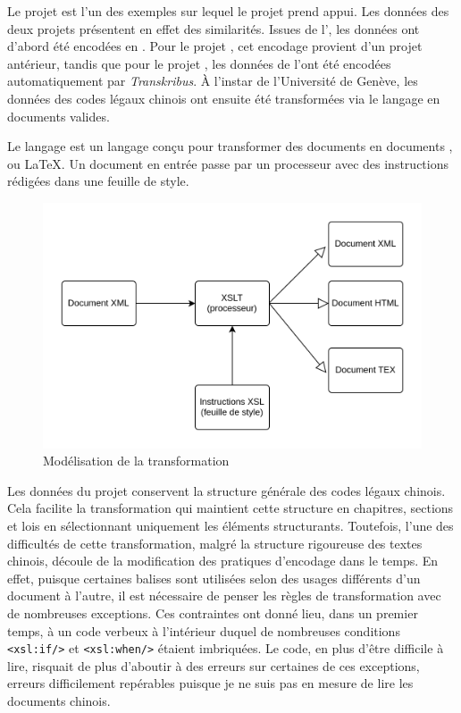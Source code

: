 Le projet \cordel est l'un des exemples sur lequel le projet \COREL prend appui. Les données des deux projets présentent en effet des similarités. Issues de l'\OCR, les données ont d'abord été encodées en \XML. Pour le projet \COREL, cet encodage provient d'un projet antérieur, tandis que pour le projet \cordel, les données de l'\OCR ont été encodées automatiquement par \textit{Transkribus}. À l'instar de l'Université de Genève, les données des codes légaux chinois ont ensuite été transformées via le langage \XSLT en documents \TEI valides. 

Le langage \XSLT est un langage \XML conçu pour transformer des documents \XML en documents \XML, \HTML ou \LaTeX. Un document \XML en entrée passe par un processeur \XSLT avec des instructions \XSL rédigées dans une feuille de style.

\begin{figure}
    \centering
    \includegraphics[width=\textwidth]{images/xslt.png}
    \caption{Modélisation de la transformation \XSLT}
\end{figure}

Les données du projet \LSC conservent la structure générale des codes légaux chinois. Cela facilite la transformation \XSLT qui maintient cette structure en chapitres, sections et lois en sélectionnant uniquement les éléments structurants. Toutefois, l'une des difficultés de cette transformation, malgré la structure rigoureuse des textes chinois, découle de la modification des pratiques d'encodage dans le temps. En effet, puisque certaines balises sont utilisées selon des usages différents d'un document à l'autre, il est nécessaire de penser les règles de transformation avec de nombreuses exceptions. Ces contraintes ont donné lieu, dans un premier temps, à un code verbeux à l'intérieur duquel de nombreuses conditions \texttt{<xsl:if/>} et \texttt{<xsl:when/>} étaient imbriquées. Le code, en plus d'être difficile à lire, risquait de plus d'aboutir à des erreurs sur certaines de ces exceptions, erreurs difficilement repérables puisque je ne suis pas en mesure de lire les documents chinois. 

